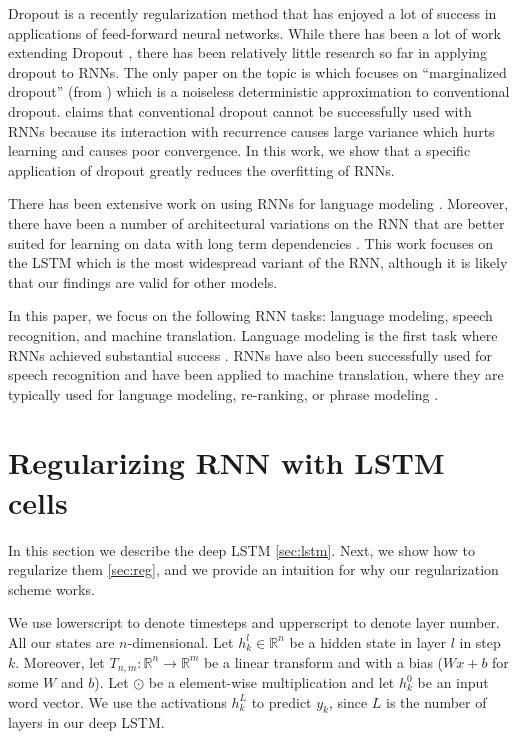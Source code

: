 \documentclass{article}
\begin{document}
Dropout \cite{srivastava2013improving} is a recently regularization
method that has enjoyed a lot of success in applications of
feed-forward neural networks.  While there has been a lot of work
extending Dropout \cite{wang2013fast, wan2013regularization}, there
has been relatively little research so far in applying dropout to
RNNs. The only paper on the topic is \cite{bayer2013fast} which
focuses on ``marginalized dropout'' (from \cite{wang2013fast}) which
is a noiseless deterministic approximation to conventional dropout.
\cite{bayer2013fast} claims that conventional dropout cannot be
successfully used with RNNs because its interaction with recurrence
causes large variance which hurts learning and causes poor
convergence. In this work, we show that a specific application of
dropout greatly reduces the overfitting of RNNs.

There has been extensive work on using RNNs for language modeling
\cite{mikolov2012statistical, sutskever2013training}. Moreover, there
have been a number of architectural variations on the RNN that are
better suited for learning on data with long term dependencies
\cite{hochreiter1997long, graves2009novel, cho2014learning,
  jaeger2007optimization, koutnik2014clockwork}.  This work focuses on the LSTM which
is the most widespread variant of the RNN, although it is likely that 
our findings are valid for other models.

In this paper, we focus on the following RNN tasks: language
modeling, speech recognition, and machine translation.  Language
modeling is the first task where RNNs achieved substantial success
\cite{mikolov2010recurrent, mikolov2011strategies,
  pascanu2013construct}.  RNNs have also been successfully used for
speech recognition \cite{robinson1996use, graves2013speech} and have
been applied to machine translation, where they are typically
used for language modeling, re-ranking, or phrase modeling
\cite{SVL2014,cho2014learning,chow1987byblos,mikolov2013exploiting}.

\section{Regularizing RNN with LSTM cells}

In this section we describe the deep LSTM \ref{sec:lstm}. Next, 
we show how to regularize them \ref{sec:reg}, and we provide an intuition
for why our regularization scheme works.

We use lowerscript to denote timesteps and upperscript to denote 
layer number.  All our states are $n$-dimensional.  Let $h^l_k
\in \mathbb{R}^{n}$ be a hidden state in layer $l$ in step
$k$. Moreover, let $T_{n,m}:\mathbb{R}^{n} \rightarrow \mathbb{R}^{m}$
be a linear transform and with a bias ($Wx + b$ for some $W$ and $b$).
Let $\odot$ be a element-wise multiplication and let $h^0_k$ be an
input word vector.  We use the activations $h^{L}_k$ to predict $y_k$,
since $L$ is the number of layers in our deep LSTM.
\end{document}
